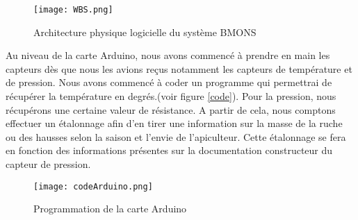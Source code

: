 \begin{figure}[h!]
\centering\texttt{[image: WBS.png]}
\caption{\label{fig:SDP} Architecture physique logicielle du système BMONS}
\end{figure}

\newpage

Au niveau de la carte Arduino, nous avons commencé à prendre en main les capteurs dès que nous les avions reçus notamment les capteurs de température et de pression. Nous avons commencé à coder un programme qui permettrai de récupérer la température en degrés.(voir figure \ref{code}). Pour la pression, nous récupérons une certaine valeur de résistance. A partir de cela, nous comptons effectuer un étalonnage afin d'en tirer une information sur la masse de la ruche ou des hausses selon la saison et l'envie de l'apiculteur. Cette étalonnage se fera en fonction des informations présentes sur la documentation constructeur du capteur de pression.

\begin{figure}[h!]
\centering\texttt{[image: codeArduino.png]}
\caption{\label{fig:code} Programmation de la carte Arduino}
\end{figure}  

\clearpage